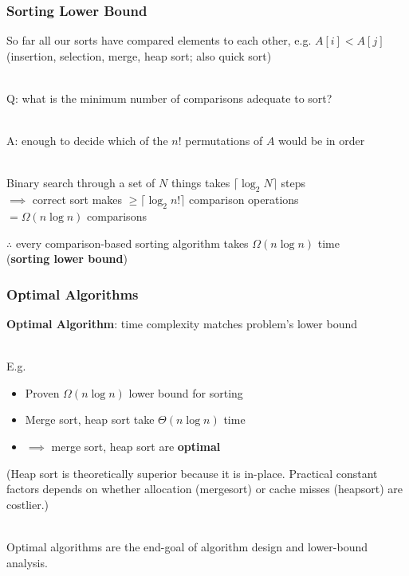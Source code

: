 \documentclass{beamer}
\newcommand{\stanza}{ \\~\ }
\begin{document}
\begin{frame} \frametitle{Sorting Lower Bound}
So far all our sorts have compared elements to each other, e.g. $A[i] < A[j]$ \\
(insertion, selection, merge, heap sort; also quick sort) \stanza

Q: what is the minimum number of comparisons adequate to sort? \stanza

A: enough to decide which of the $n!$ permutations of $A$ would be in order \stanza

Binary search through a set of $N$ things takes $\lceil \log_2 N \rceil$ steps \\
$\implies $ correct sort makes $\geq \lceil \log_2 n! \rceil$ comparison operations \\
$= \Omega(n \log n)$ comparisons

$\therefore$ every comparison-based sorting algorithm takes $\Omega(n \log n)$ time \\
(\textbf{sorting lower bound})
\end{frame}

\begin{frame} \frametitle{Optimal Algorithms}
\textbf{Optimal Algorithm}: time complexity matches problem's lower bound \stanza

E.g.
\begin{itemize}
  \item Proven $\Omega(n \log n)$ lower bound for sorting
  \item Merge sort, heap sort take $\Theta(n \log n)$ time
  \item $\implies$ merge sort, heap sort are \textbf{optimal}
\end{itemize}

(Heap sort is theoretically superior because it is in-place.
Practical constant factors depends on whether allocation (mergesort) or cache misses (heapsort) are costlier.)
\stanza

Optimal algorithms are the end-goal of algorithm design and lower-bound analysis.
\end{frame}
\end{document}
